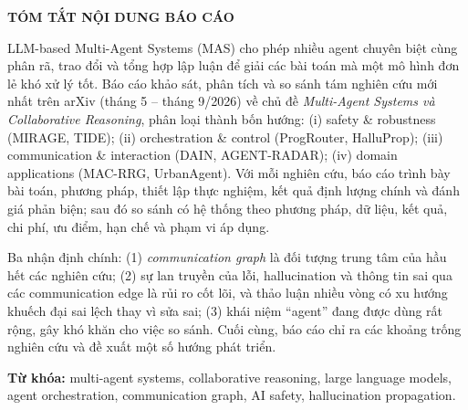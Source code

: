 \documentclass[a4paper,13pt,twoside]{report}
\newcommand{\MAS}{MAS}
\begin{document}
\thispagestyle{fancy}
\begin{center}
\Large\textbf{TÓM TẮT NỘI DUNG BÁO CÁO}
\end{center}
\vspace{1cm}
LLM-based Multi-Agent Systems (\MAS) cho phép nhiều agent chuyên biệt cùng phân rã, trao đổi và
tổng hợp lập luận để giải các bài toán mà một mô hình đơn lẻ khó xử lý tốt. Báo cáo khảo sát, phân
tích và so sánh tám nghiên cứu mới nhất trên arXiv (tháng 5 -- tháng 9/2026) về chủ đề
\emph{Multi-Agent Systems và Collaborative Reasoning}, phân loại thành bốn hướng:
(i) safety \& robustness (MIRAGE, TIDE); (ii) orchestration \& control (ProgRouter, HalluProp);
(iii) communication \& interaction (DAIN, AGENT-RADAR); (iv) domain applications (MAC-RRG,
UrbanAgent). Với mỗi nghiên cứu, báo cáo trình bày bài toán, phương pháp, thiết lập thực nghiệm,
kết quả định lượng chính và đánh giá phản biện; sau đó so sánh có hệ thống theo phương pháp, dữ
liệu, kết quả, chi phí, ưu điểm, hạn chế và phạm vi áp dụng.

Ba nhận định chính: (1) \emph{communication graph} là đối tượng trung tâm của hầu hết các nghiên
cứu; (2) sự lan truyền của lỗi, hallucination và thông tin sai qua các communication edge là rủi ro
cốt lõi, và thảo luận nhiều vòng có xu hướng khuếch đại sai lệch thay vì sửa sai; (3) khái niệm
``agent'' đang được dùng rất rộng, gây khó khăn cho việc so sánh. Cuối cùng, báo cáo chỉ ra các
khoảng trống nghiên cứu và đề xuất một số hướng phát triển.

\vspace{6pt}
\noindent\textbf{Từ khóa:} multi-agent systems, collaborative reasoning, large language models,
agent orchestration, communication graph, AI safety, hallucination propagation.
\newpage

\tableofcontents
\newpage

\renewcommand{\listfigurename}{DANH MỤC HÌNH VẼ}
{\let\oldnumberline\numberline
\renewcommand{\numberline}{Hình~\oldnumberline}
\listoffigures}
\newpage

\renewcommand{\listtablename}{DANH MỤC BẢNG BIỂU}
{\let\oldnumberline\numberline
\renewcommand{\numberline}{Bảng~\oldnumberline}
\listoftables}
\newpage
\end{document}
